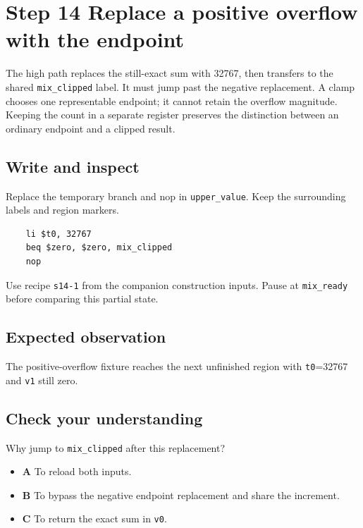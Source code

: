 \section{Step 14 Replace a positive overflow with the endpoint}\label{pcm-s14}

The high path replaces the still-exact sum with 32767, then transfers to the shared \texttt{mix\_clipped} label. It must jump past the negative replacement. A clamp chooses one representable endpoint; it cannot retain the overflow magnitude. Keeping the count in a separate register preserves the distinction between an ordinary endpoint and a clipped result.

\subsection{Write and inspect}
Replace the temporary branch and nop in \texttt{upper\_value}. Keep the surrounding labels and region markers.

\begin{verbatim}
    li $t0, 32767
    beq $zero, $zero, mix_clipped
    nop
\end{verbatim}
Use recipe \texttt{s14-1} from the companion construction inputs. Pause at \texttt{mix\_ready} before comparing this partial state.

\subsection{Expected observation}
The positive-overflow fixture reaches the next unfinished region with \texttt{t0}=32767 and \texttt{v1} still zero.

\subsection{Check your understanding}
Why jump to \texttt{mix\_clipped} after this replacement?

\begin{itemize}
  \item \textbf{A} To reload both inputs.
  \item \textbf{B} To bypass the negative endpoint replacement and share the increment.
  \item \textbf{C} To return the exact sum in \texttt{v0}.
\end{itemize}
